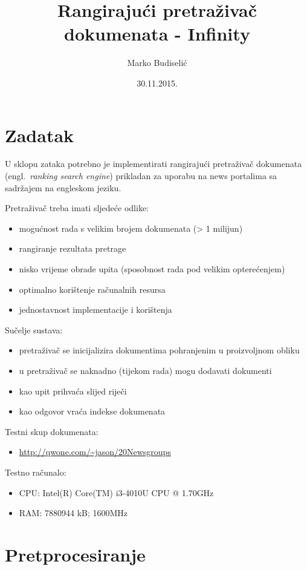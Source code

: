 \documentclass[a4paper,12pt]{article}
\title{Rangirajući pretraživač dokumenata - Infinity}
\author{Marko Budiselić}
\date{30.11.2015.}
\newcommand{\engl}[1]{(engl.~\emph{#1})}
\begin{document}
\maketitle

\section{Zadatak}

U sklopu zataka potrebno je implementirati rangirajući pretraživač dokumenata \engl{ranking search engine} prikladan za uporabu na news portalima sa sadržajem na engleskom jeziku.

Pretraživač treba imati sljedeće odlike:
\begin{itemize}
\item mogućnost rada s velikim brojem dokumenata (> 1 milijun)
\item rangiranje rezultata pretrage
\item nisko vrijeme obrade upita (sposobnost rada pod velikim opterećenjem)
\item optimalno korištenje računalnih resursa
\item jednostavnost implementacije i korištenja
\end{itemize}

Sučelje sustava:
\begin{itemize}
\item pretraživač se inicijalizira dokumentima pohranjenim u proizvoljnom obliku
\item u pretraživač se naknadno (tijekom rada) mogu dodavati dokumenti
\item kao upit prihvaća slijed riječi
\item kao odgovor vraća indekse dokumenata
\end{itemize}

Testni skup dokumenata:
\begin{itemize}
\item \url{http://qwone.com/~jason/20Newsgroups}
\end{itemize}

Testno računalo:
\begin{itemize}
\item CPU: Intel(R) Core(TM) i3-4010U CPU @ 1.70GHz
\item RAM: 7880944 kB; 1600MHz
\end{itemize}

\section{Pretprocesiranje}
\end{document}
